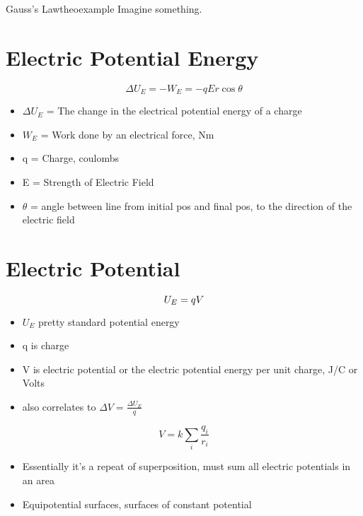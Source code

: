 \documentclass{article}
\begin{document}
\begin{mytheo}{Gauss's Law}{theoexample}
	Imagine something.
\end{mytheo}

\section{Electric Potential Energy}
\[
	\Delta U_{E} = -W_{E} = -qEr\cos{\theta}
\]
\begin{itemize}
	\item $\Delta U_{E}$ = The change in the electrical potential energy of a charge
	\item $W_{E}$ = Work done by an electrical force, Nm
	\item q = Charge, coulombs
	\item E = Strength of Electric Field
	\item $\theta$ = angle between line from initial pos and final pos, to the direction of the electric field
	 
\end{itemize}
\section{Electric Potential}
\[
	U_{E} = qV\\
\]
\begin{itemize}
	\item $U_{E}$ pretty standard potential energy
	\item q is charge
	\item V is electric potential or the electric potential energy per unit charge, J/C or Volts
	\item also correlates to $\Delta V = \frac{\Delta U_{E}}{q}$
\end{itemize}
\[
	V=k \sum_{i}\frac{q_{i}}{r_{i}}
\]
\begin{itemize}
	\item Essentially it's a repeat of superposition, must sum all electric potentials in an area  
	\item Equipotential surfaces, surfaces of constant potential
\end{itemize}
\end{document}
